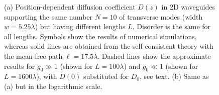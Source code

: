 \begin{figure}
\vskip -0.5cm
\vskip -0.7cm
\caption[(a) Position-dependent diffusion coefficient $D(z)$ in 2D waveguides supporting the same number $N = 10$ of transverse modes (width $w=5.25\lambda$) but having different lengths $L$.]{\label{fig2} (a) Position-dependent diffusion coefficient $D(z)$ in 2D waveguides supporting the same number $N = 10$ of transverse modes (width $w=5.25\lambda$) but having different lengths $L$. Disorder is the same for all lengths. Symbols show the results of numerical simulations, whereas solid lines are obtained from the self-consistent theory with the mean free path $\ell = 17.5\lambda$. Dashed lines show the approximate results for
$g_0 \gg 1$ (shown for $L = 100 \lambda$) and $g_0 \ll 1$ (shown for $L = 1600 \lambda$), with $D(0)$ substituted for $D_0$, see text. (b) Same as (a) but in the logarithmic scale.}
\end{figure}

